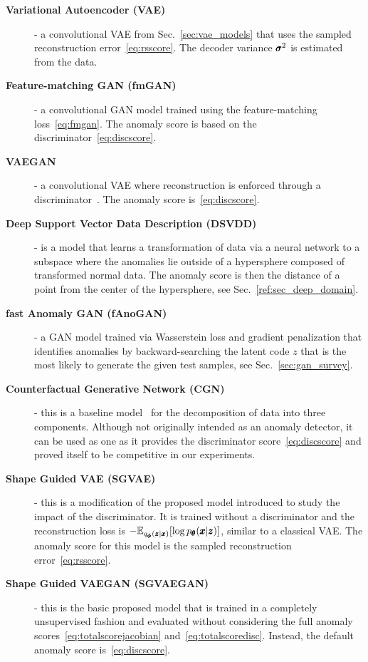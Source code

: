 \begin{description}
    \item[\textbf{Variational Autoencoder (VAE)}] - a convolutional VAE from Sec.~\ref{sec:vae_models} that uses the sampled reconstruction error~\eqref{eq:rsscore}. The decoder variance $\pmb{{\sigma}}^2$ is estimated from the data.
    \item[\textbf{Feature-matching GAN (fmGAN)}] - a convolutional GAN model trained using the feature-matching loss~\eqref{eq:fmgan}. The anomaly score is based on the discriminator~\eqref{eq:discscore}.
    \item[\textbf{VAEGAN}] - a  convolutional VAE where reconstruction is enforced through a discriminator~\cite{larsen2016autoencoding}. The anomaly score is~\eqref{eq:discscore}.
    \item[\textbf{Deep Support Vector Data Description (DSVDD)}] - is a model that learns a transformation of data via a neural network to a subspace where the anomalies lie outside of a hypersphere composed of transformed normal data. The anomaly score is then the distance of a point from the center of the hypersphere, see Sec.~\ref{ref:sec_deep_domain}.
    \item[\textbf{fast Anomaly GAN (fAnoGAN)}] - a GAN model trained via Wasserstein loss and gradient penalization that identifies anomalies by backward-searching the latent code $z$ that is the most likely to generate the given test samples, see Sec.~\ref{sec:gan_survey}.
    \item[\textbf{Counterfactual Generative Network (CGN)}] - this is a baseline model~\cite{sauer2021counterfactual} for the decomposition of data into three components. Although not originally intended as an anomaly detector, it can be used as one as it provides the discriminator score~\eqref{eq:discscore} and proved itself to be competitive in our experiments.
    \item[\textbf{Shape Guided VAE (SGVAE)}] - this is a modification of the proposed model introduced to study the impact of the discriminator. It is trained without a discriminator and the reconstruction loss is $ -\mathbb{E}_{q_{\pmb{{\phi}}}(\pmb{{z}} \vert \pmb{{x}})}[\log p_{\pmb{{\theta}}}(\pmb{{x}} \vert \pmb{{z}})]$, similar to a classical VAE. The anomaly score for this model is the sampled reconstruction error~\eqref{eq:rsscore}.
    \item[\textbf{Shape Guided VAEGAN (SGVAEGAN)}] - this is the basic proposed model that is trained in a completely unsupervised fashion and evaluated without considering the full anomaly scores~\eqref{eq:totalscorejacobian} and~\eqref{eq:totalscoredisc}. Instead, the default anomaly score is~\eqref{eq:discscore}.

\end{description}
